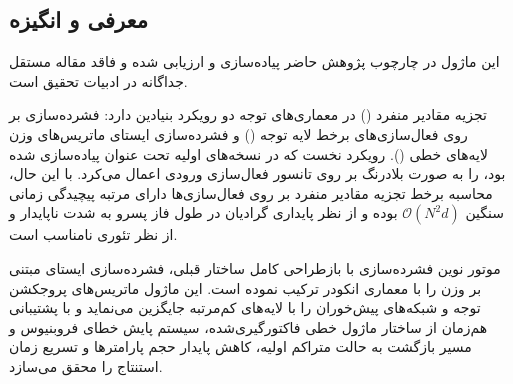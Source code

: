\subsection{معرفی و انگیزه}
این ماژول در چارچوب پژوهش حاضر پیاده‌سازی و ارزیابی شده و فاقد مقاله مستقل جداگانه در ادبیات تحقیق است.

تجزیه مقادیر منفرد () در معماری‌های توجه دو رویکرد بنیادین دارد: فشرده‌سازی بر روی فعال‌سازی‌های برخط لایه توجه () و فشرده‌سازی ایستای ماتریس‌های وزن لایه‌های خطی (). رویکرد نخست که در نسخه‌های اولیه تحت عنوان  پیاده‌سازی شده بود،  را به صورت بلادرنگ بر روی تانسور فعال‌سازی ورودی اعمال می‌کرد. با این حال، محاسبه برخط تجزیه مقادیر منفرد بر روی فعال‌سازی‌ها دارای مرتبه پیچیدگی زمانی سنگین $\mathcal{O}(N^2 d)$ بوده و از نظر پایداری گرادیان در طول فاز پسرو به شدت ناپایدار و از نظر تئوری نامناسب است.

موتور نوین فشرده‌سازی  با بازطراحی کامل ساختار قبلی، فشرده‌سازی ایستای مبتنی بر وزن را با معماری انکودر ترکیب نموده است. این ماژول ماتریس‌های پروجکشن توجه و شبکه‌های پیش‌خوران را با لایه‌های کم‌مرتبه  جایگزین می‌نماید و با پشتیبانی هم‌زمان از ساختار ماژول خطی فاکتورگیری‌شده، سیستم پایش خطای فروبنیوس و مسیر بازگشت به حالت متراکم اولیه، کاهش پایدار حجم پارامترها و تسریع زمان استنتاج را محقق می‌سازد.

